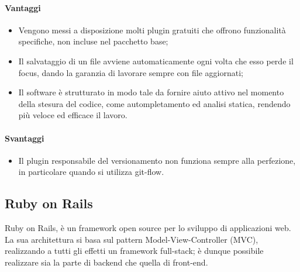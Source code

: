 \paragraph{Vantaggi}
\begin{itemize}
	\item Vengono messi a disposizione molti plugin gratuiti che offrono funzionalità specifiche, non incluse nel pacchetto base;
	\item Il salvataggio di un file avviene automaticamente ogni volta che esso perde il focus, dando la garanzia di lavorare sempre con file aggiornati;
	\item Il software è strutturato in modo tale da fornire aiuto attivo nel momento della stesura del codice, come autompletamento ed analisi statica, rendendo più veloce ed efficace il lavoro.
\end{itemize}
\paragraph{Svantaggi}
\begin{itemize}
	\item Il plugin responsabile del versionamento non funziona sempre alla perfezione, in particolare quando si utilizza git-flow.
\end{itemize}

\subsection{Ruby on Rails}

Ruby on Rails, è un framework open source per lo sviluppo di applicazioni web.
La sua architettura si basa sul pattern Model-View-Controller (MVC), realizzando a tutti gli effetti un framework full-stack; è dunque possibile realizzare sia la parte di backend che quella di \gls{front-end}.
